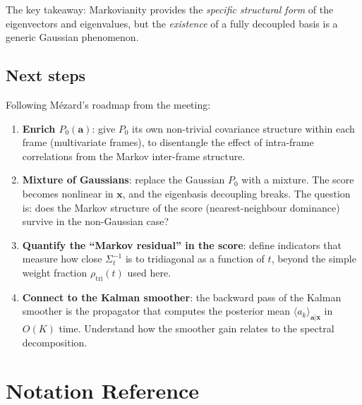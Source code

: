 \documentclass[11pt,a4paper]{article}
\begin{document}
\medskip
The key takeaway: Markovianity provides the \emph{specific structural form} of the eigenvectors and eigenvalues, but the \emph{existence} of a fully decoupled basis is a generic Gaussian phenomenon.

\subsection{Next steps}

Following M\'ezard's roadmap from the meeting:
\begin{enumerate}[label=(\roman*), nosep]
  \item \textbf{Enrich $P_0(\mathbf{a})$}: give $P_0$ its own non-trivial covariance structure within each frame (multivariate frames), to disentangle the effect of intra-frame correlations from the Markov inter-frame structure.
  \item \textbf{Mixture of Gaussians}: replace the Gaussian $P_0$ with a mixture.  The score becomes nonlinear in $\mathbf{x}$, and the eigenbasis decoupling breaks.  The question is: does the Markov structure of the score (nearest-neighbour dominance) survive in the non-Gaussian case?
  \item \textbf{Quantify the ``Markov residual'' in the score}: define indicators that measure how close $\Sigma_t^{-1}$ is to tridiagonal as a function of $t$, beyond the simple weight fraction $\rho_{\mathrm{tri}}(t)$ used here.
  \item \textbf{Connect to the Kalman smoother}: the backward pass of the Kalman smoother is the propagator that computes the posterior mean $\langle a_k \rangle_{\mathbf{a}|\mathbf{x}}$ in $O(K)$ time.  Understand how the smoother gain relates to the spectral decomposition.
\end{enumerate}

\section{Notation Reference}
\label{sec:notation}
\end{document}
